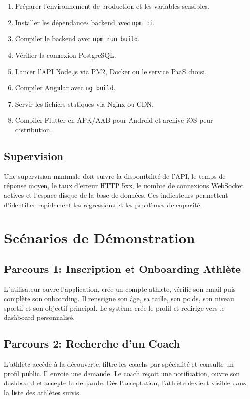 \begin{enumerate}
  \item Préparer l'environnement de production et les variables sensibles.
  \item Installer les dépendances backend avec \texttt{npm ci}.
  \item Compiler le backend avec \texttt{npm run build}.
  \item Vérifier la connexion PostgreSQL.
  \item Lancer l'API Node.js via PM2, Docker ou le service PaaS choisi.
  \item Compiler Angular avec \texttt{ng build}.
  \item Servir les fichiers statiques via Nginx ou CDN.
  \item Compiler Flutter en APK/AAB pour Android et archive iOS pour distribution.
\end{enumerate}

\section{Supervision}
Une supervision minimale doit suivre la disponibilité de l'API, le temps de réponse moyen, le taux d'erreur HTTP 5xx, le nombre de connexions WebSocket actives et l'espace disque de la base de données. Ces indicateurs permettent d'identifier rapidement les régressions et les problèmes de capacité.

\chapter{Scénarios de Démonstration}
\minitoc
\newpage

\section{Parcours 1: Inscription et Onboarding Athlète}
L'utilisateur ouvre l'application, crée un compte athlète, vérifie son email puis complète son onboarding. Il renseigne son âge, sa taille, son poids, son niveau sportif et son objectif principal. Le système crée le profil et redirige vers le dashboard personnalisé.

\section{Parcours 2: Recherche d'un Coach}
L'athlète accède à la découverte, filtre les coachs par spécialité et consulte un profil public. Il envoie une demande. Le coach reçoit une notification, ouvre son dashboard et accepte la demande. Dès l'acceptation, l'athlète devient visible dans la liste des athlètes suivis.

